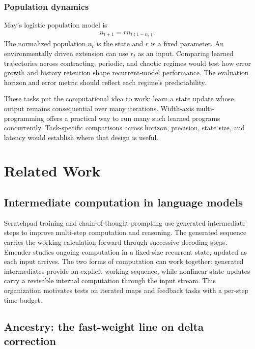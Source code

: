 \documentclass[10pt]{article}
\theoremstyle{canonical}
\theoremstyle{canonicalbullet}
\begin{document}
\subsubsection*{Population dynamics}


May's logistic population model \citep{may1976} is
\[\begin{aligned}{n }_{t + 1} =  r  {n }_{t ( 1- {n }_{t }) }. \end{aligned}\]
 The normalized population ${n }_{t }$ is the state and $r $ is a fixed parameter. An environmentally driven extension can use ${r }_{t }$ as an input. Comparing learned trajectories across contracting, periodic, and chaotic regimes would test how error growth and history retention shape recurrent-model performance. The evaluation horizon and error metric should reflect each regime's predictability.

These tasks put the computational idea to work: learn a state update whose output remains consequential over many iterations. Width-axis multi-programming offers a practical way to run many such learned programs concurrently. Task-specific comparisons across horizon, precision, state size, and latency would establish where that design is useful.


\section{Related Work}\label{sec:related}



\subsection*{Intermediate computation in language models}


Scratchpad training \citep{nye2021scratchpads} and chain-of-thought prompting \citep{wei2022chain} use generated intermediate steps to improve multi-step computation and reasoning. The generated sequence carries the working calculation forward through successive decoding steps. Emender studies ongoing computation in a fixed-size recurrent state, updated as each input arrives. The two forms of computation can work together: generated intermediates provide an explicit working sequence, while nonlinear state updates carry a revisable internal computation through the input stream. This organization motivates tests on iterated maps and feedback tasks with a per-step time budget.


\subsection*{Ancestry: the fast-weight line on delta correction}
\end{document}
